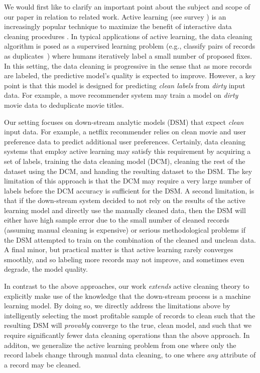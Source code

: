 We would first like to clarify an important point about the subject and scope of our paper in relation to related work.
Active learning (see survey \cite{settles2010active}) is an increasingly popular technique to maximize the benefit of interactive data cleaning procedures \cite{DBLP:journals/pvldb/YakoutENOI11, gokhale2014corleone, yakout2013don, DBLP:journals/pvldb/HaasKWF015}.
In typical applications of active learning, the data cleaning algorithm is posed as a supervised learning problem (e.g., classify pairs of records as duplicates~\cite{gokhale2014corleone}) where humans iteratively label a small number of proposed fixes.
In this setting, the data cleaning is progressive in the sense that as more records are labeled, the predictive model's quality is expected to improve.
However, a key point is that this model is designed for predicting {\it clean labels} from {\it dirty} input data.  
For example, a move recommender system may train a model on {\it dirty} movie data to deduplicate movie titles.

Our \sys setting focuses on down-stream analytic models (DSM) that expect {\it clean} input data.  
For example, a netflix recommender relies on clean movie and user preference data to predict additional user preferences.   
Certainly, data cleaning systems that employ active learning may satisfy this requirement by acquiring a set of labels, training the data cleaning model (DCM), cleaning the rest of the dataset using the DCM,
and handing the resulting dataset to the DSM.
The key limitation of this approach is that the DCM may require a very large number of labels before the DCM accuracy is sufficient for the DSM.
A second limitation, is that if the down-stream system decided to not rely on the results of the active learning model and directly use the manually cleaned data, then
the DSM will either have high sample error due to the small number of cleaned records (assuming manual cleaning is expensive) or 
serious methodological problems if the DSM attempted to train on the combination of the cleaned and unclean data.
A final minor, but practical matter is that active learning rarely converges smoothly, and so labeling more records may not improve, and sometimes even degrade, the model quality.

In contrast to the above approaches, our work {\it extends} active cleaning theory to explicitly make use of the knowledge that the down-stream process is a machine learning model.
By doing so, we directly address the limitations above by intelligently selecting the most profitable sample of records to clean such that 
the resulting DSM will {\it provably} converge to the true, clean model, and such that we require significantly fewer data cleaning operations than the above approach.
In additon, we generalize the active learning problem from one where only the record labels change through manual data cleaning, to one where {\it any} attribute of a record may be cleaned.


